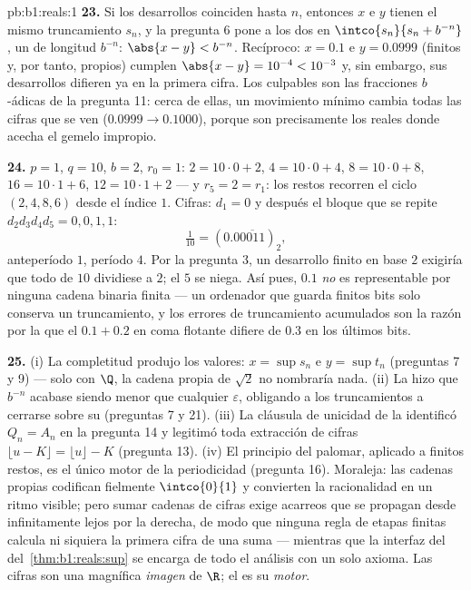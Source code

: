 \begin{solution}{pb:b1:reals:1}
\textbf{23.} Si los desarrollos coinciden hasta $n$, entonces $x$ e $y$
tienen el mismo truncamiento $s_n$, y la pregunta 6 pone a los dos en
$\intco{s_n}{s_n + b^{-n}}$, un  de longitud $b^{-n}$:
$\abs{x - y} < b^{-n}$. Recíproco: $x = 0.1$ e $y = 0.0999$ (finitos y,
por tanto, propios) cumplen $\abs{x - y} = 10^{-4} < 10^{-3}$ y, sin
embargo, sus desarrollos difieren ya en la primera cifra. Los culpables
son las fracciones $b$-ádicas de la pregunta 11: cerca de ellas, un
movimiento mínimo cambia todas las cifras que se ven ($0.0999 \to
0.1000$), porque son precisamente los reales donde acecha el gemelo
impropio.

\textbf{24.} $p = 1$, $q = 10$, $b = 2$, $r_0 = 1$: $2 = 10 \cdot 0 +
2$, $4 = 10 \cdot 0 + 4$, $8 = 10 \cdot 0 + 8$, $16 = 10 \cdot 1 + 6$,
$12 = 10 \cdot 1 + 2$ --- y $r_5 = 2 = r_1$: los restos recorren el
ciclo $(2, 4, 8, 6)$ desde el índice $1$. Cifras: $d_1 = 0$ y después
el bloque que se repite $d_2 d_3 d_4 d_5 = 0, 0, 1, 1$:
\[
\tfrac{1}{10} = (0.0\overline{0011})_2 ,
\]
anteperíodo $1$, período $4$. Por la pregunta 3, un desarrollo finito
en base $2$ exigiría que todo  de $10$ dividiese a $2$; el
 $5$ se niega. Así pues, $0.1$ \emph{no} es representable por
ninguna cadena binaria finita --- un ordenador que guarda finitos bits
solo conserva un truncamiento, y los errores de truncamiento
acumulados son la razón por la que el $0.1 + 0.2$ en coma flotante
difiere de $0.3$ en los últimos bits.

\textbf{25.} (i) La completitud produjo los valores: $x = \sup s_n$ e
$y = \sup t_n$ (preguntas 7 y 9) --- solo con $\Q$, la cadena propia
de $\sqrt 2$ no nombraría nada. (ii) La  hizo
que $b^{-n}$ acabase siendo menor que cualquier $\varepsilon$,
obligando a los truncamientos a cerrarse sobre su 
(preguntas 7 y 21). (iii) La cláusula de unicidad de la 
identificó $Q_n = A_n$ en la pregunta 14 y legitimó toda extracción de
cifras $\lfloor u - K \rfloor = \lfloor u \rfloor - K$ (pregunta 13).
(iv) El principio del palomar, aplicado a finitos restos, es el único
motor de la periodicidad (pregunta 16). Moraleja: las cadenas propias
codifican fielmente $\intco{0}{1}$ y convierten la racionalidad en un
ritmo visible; pero sumar cadenas de cifras exige acarreos que se
propagan desde infinitamente lejos por la derecha, de modo que ninguna
regla de etapas finitas calcula ni siquiera la primera cifra de una
suma --- mientras que la interfaz del 
del~\cref{thm:b1:reals:sup} se encarga de todo el análisis con un solo
axioma. Las cifras son una magnífica \emph{imagen} de $\R$; el
 es su \emph{motor}.
\end{solution}
